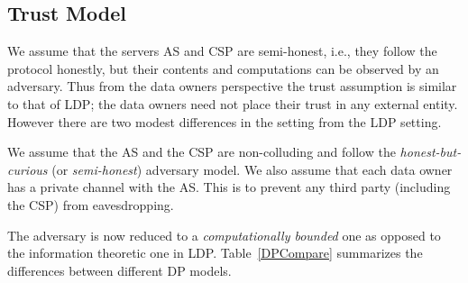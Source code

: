 \subsection{Trust Model}\label{sec:trust}
We assume that the servers \textsf{AS} and \textsf{CSP} are semi-honest, i.e., they follow the protocol honestly, but their contents and computations can be observed by an adversary.
Thus from the data owners perspective the trust assumption is similar to that of \textsf{LDP}; the data owners need not place their trust in any external entity.
However there are two modest differences in the \system setting from the \textsf{LDP} setting.
\squishlist
\item We assume that the \textsf{AS} and the \textsf{CSP} are non-colluding and follow the \emph{honest-but-curious} (or \textit{semi-honest}) adversary model. %
We also assume that each data owner has a private channel with the \textsf{AS}. This is to prevent any third party (including the \textsf{CSP}) from eavesdropping.
\item The adversary is now reduced to a \textit{computationally bounded} one as opposed to the information theoretic one  in \textsf{LDP}.
 \squishend
Table~\ref{DPCompare} summarizes the differences between different DP models.
\begin{table}[t]
\centering
\caption {Comparative analysis of the different DP models}
\label{DPCompare}
\end{table}

